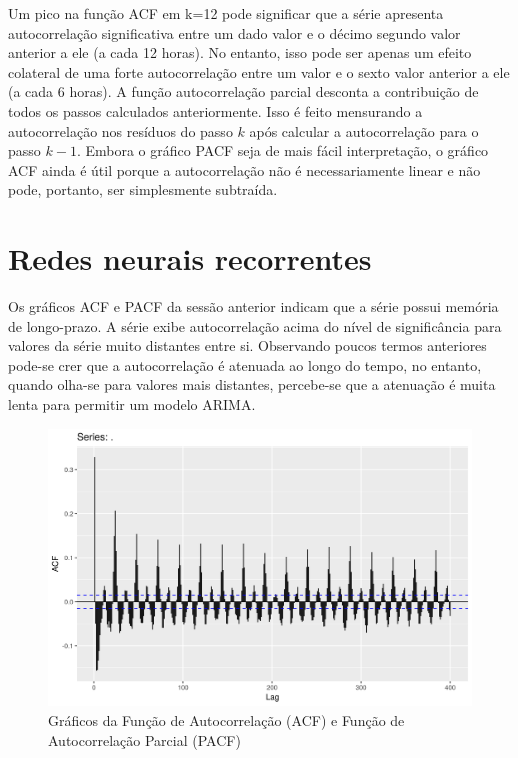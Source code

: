 \documentclass[
	12pt,				%
	openright,			%
	oneside,			%
	a4paper,			%
	english,			%
	french,				%
	spanish,			%
	brazil				%
	]{abntex2}
\begin{document}
Um pico na função ACF em k=12 pode significar que a série apresenta autocorrelação significativa entre um dado valor e o décimo segundo valor anterior a ele (a cada 12 horas). No entanto, isso pode ser apenas um efeito colateral de uma forte autocorrelação entre um valor e o sexto valor anterior a ele (a cada 6 horas). A função autocorrelação parcial desconta a contribuição de todos os passos calculados anteriormente. Isso é feito mensurando a autocorrelação nos resíduos do passo $k$ após calcular a autocorrelação para o passo $k-1$. Embora o gráfico PACF seja de mais fácil interpretação, o gráfico ACF ainda é útil porque a autocorrelação não é necessariamente linear e não pode, portanto, ser simplesmente subtraída.

\section{Redes neurais recorrentes}

Os gráficos ACF e PACF da sessão anterior indicam que a série possui memória de longo-prazo. A série exibe autocorrelação acima do nível de significância para valores da série muito distantes entre si. Observando poucos termos anteriores pode-se crer que a autocorrelação é atenuada ao longo do tempo, no entanto, quando olha-se para valores mais distantes, percebe-se que a atenuação é muita lenta para permitir um modelo ARIMA.

\begin{figure}[h]
    \centering
	\includegraphics[width=\textwidth]{long_memory_lagmax.png}
	\caption{Gráficos da Função de Autocorrelação (ACF) e Função de Autocorrelação Parcial (PACF)}
\end{figure}
\FloatBarrier 
\end{document}
